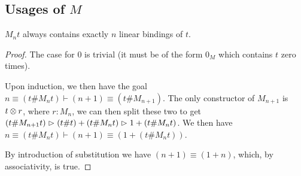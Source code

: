 \subsection{Usages of $M$}

\begin{lemma}
	$M_n t$ always contains exactly $n$ linear bindings of $t$.
\end{lemma}
\begin{proof}
	The case for $0$ is trivial (it must be of the form $0_M$ which contains $t$ zero times).
	
	Upon induction, we then have the goal $n \equiv (t \# M_n t) \vdash (n + 1) \equiv (t \# M_{n + 1})$.
	The only constructor of $M_{n + 1}$ is $t \otimes r$, where $r : M_n$, we can then split these two to get $(t \# M_{n + 1} t) \vartriangleright (t \# t) + (t \# M_n t) \vartriangleright 1 + (t \# M_n t)$.
	We then have $n \equiv (t \# M_n t) \vdash (n + 1) \equiv (1 + (t \# M_n t))$.
	
	By introduction of substitution we have $(n + 1) \equiv (1 + n)$, which, by associativity, is true.
\end{proof}

